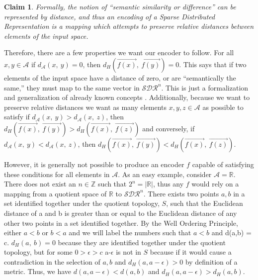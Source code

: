 \documentclass[fleqn,minimal]{article}
\newtheorem{clm}{Claim}
\begin{document}
	\begin{clm}
		Formally, the notion of ``semantic similarity or difference'' can be represented by distance, and thus an encoding of a Sparse Distributed Representation is a mapping which attempts to preserve relative distances between elements of the input space.
	\end{clm}
	
	Therefore, there are a few properties we want our encoder to follow. For all $x,y \in \mathcal{A}$ if  $d_{\mathcal{A}}(x, \ y) = 0$, then $d_{H}(\overrightarrow{f(x)}, \ \overrightarrow{f(y)}) = 0$. This says that if two elements of the input space have a distance of zero, or are ``semantically the same,'' they must map to the same vector in $\mathcal{SDR}^{n}$. This is just a formalization and generalization of already known concepts \cite{Purdy}. Additionally, because we want to preserve relative distances we want as many elements $x,y,z \in \mathcal{A}$ as possible to satisfy if $d_{\mathcal{A}}(x, \ y) > d_{\mathcal{A}}(x, \ z)$, then $d_{H}(\overrightarrow{f(x)}, \ \overrightarrow{f(y)}) > d_{H}(\overrightarrow{f(x)}, \ \overrightarrow{f(z)})$ and conversely, if $d_{\mathcal{A}}(x, \ y) < d_{\mathcal{A}}(x, \ z)$, then $d_{H}(\overrightarrow{f(x)}, \ \overrightarrow{f(y)}) < d_{H}(\overrightarrow{f(x)}, \ \overrightarrow{f(z)})$. 
	
	However, it is generally not possible to produce an encoder $f$ capable of satisfying these conditions for all elements in $\mathcal{A}$. As an easy example, consider $\mathcal{A} = \mathbb{R}$. There does not exist an $n \in \mathbb{Z}$ such that $2^{n} = |\mathbb{R}|$, thus any $f$ would rely on a mapping from a quotient space of $\mathbb{R}$ to $\mathcal{SDR}^{n}$. There exists two points $a,b$ in a set identified together under the quotient topology, $S$, such that the Euclidean distance of a and b is greater than or equal to the Euclidean distance of any other two points in a set identified together. By the Well Ordering Principle, either $a < b$ or $b < a$ and we will label the numbers such that $a < b$ and d(a,b) = c. $d_{H}(a, \ b) = 0$ because they are identified together under the quotient topology, but for some $0 > \epsilon > c$ a-$\epsilon$ is not in $S$ because if it would cause a contradiction in the selection of $a,b$ and $d_{H}(a, a-\epsilon) > 0$ by definition of a metric. Thus, we have $d(a,a-\epsilon) < d(a, b)$ and $d_{H}(a, a-\epsilon) > d_{H}(a,b)$. 
	
\end{document}

